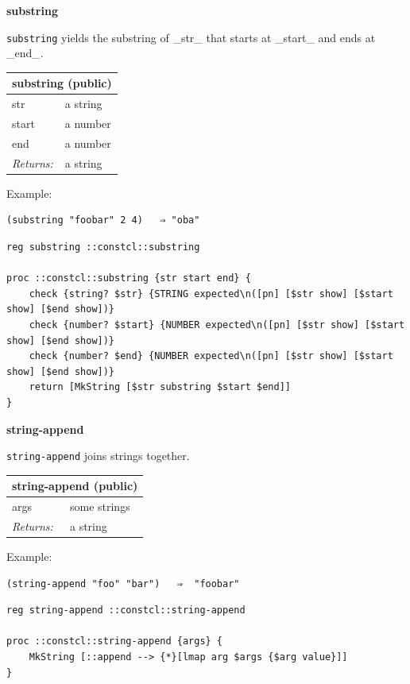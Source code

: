 \documentclass[twoside,9pt]{report}
\begin{document}
\textbf{substring}


\texttt{substring} yields the substring of \_str\_ that starts at \_start\_ and ends at \_end\_.

\begin{tabular}{ |l l| }
\hline
\multicolumn{2}{|l|}{substring (public)} \\
\hline
str & a string \\
start & a number \\
end & a number \\
\textit{Returns:} & a string \\
\hline
\end{tabular}


Example:

\noindent\makebox[\linewidth]{\rule{\linewidth}{0.4pt}}
\begin{lstlisting}
(substring "foobar" 2 4)   ⇒ "oba"
\end{lstlisting}
\noindent\makebox[\linewidth]{\rule{\linewidth}{0.4pt}}
\noindent\makebox[\linewidth]{\rule{\linewidth}{0.4pt}}
\begin{lstlisting}
reg substring ::constcl::substring
 
proc ::constcl::substring {str start end} {
    check {string? $str} {STRING expected\n([pn] [$str show] [$start show] [$end show])}
    check {number? $start} {NUMBER expected\n([pn] [$str show] [$start show] [$end show])}
    check {number? $end} {NUMBER expected\n([pn] [$str show] [$start show] [$end show])}
    return [MkString [$str substring $start $end]]
}
\end{lstlisting}
\noindent\makebox[\linewidth]{\rule{\linewidth}{0.4pt}}

\textbf{string-append}


\texttt{string-append} joins strings together.

\begin{tabular}{ |l l| }
\hline
\multicolumn{2}{|l|}{string-append (public)} \\
\hline
args & some strings \\
\textit{Returns:} & a string \\
\hline
\end{tabular}


Example:

\noindent\makebox[\linewidth]{\rule{\linewidth}{0.4pt}}
\begin{lstlisting}
(string-append "foo" "bar")   ⇒  "foobar"
\end{lstlisting}
\noindent\makebox[\linewidth]{\rule{\linewidth}{0.4pt}}
\noindent\makebox[\linewidth]{\rule{\linewidth}{0.4pt}}
\begin{lstlisting}
reg string-append ::constcl::string-append
 
proc ::constcl::string-append {args} {
    MkString [::append --> {*}[lmap arg $args {$arg value}]]
}
\end{lstlisting}
\noindent\makebox[\linewidth]{\rule{\linewidth}{0.4pt}}
\end{document}

